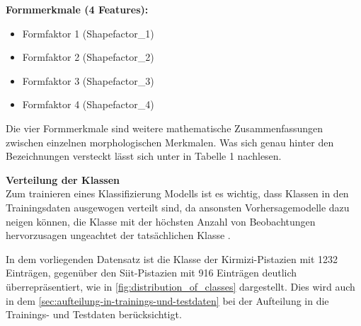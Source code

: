 \textbf{Formmerkmale (4 Features):}
\begin{itemize}[itemsep=0pt, parsep=0pt]
	\item Formfaktor 1 (Shapefactor\_1)
	\item Formfaktor 2 (Shapefactor\_2)
	\item Formfaktor 3 (Shapefactor\_3)
	\item Formfaktor 4 (Shapefactor\_4)
\end{itemize}

Die vier Formmerkmale sind weitere mathematische Zusammenfassungen zwischen einzelnen morphologischen Merkmalen.
Was sich genau hinter den Bezeichnungen versteckt lässt sich unter \parencite[4]{Ozkan.2021} in Tabelle 1 nachlesen.

%
%
%

\textbf{Verteilung der Klassen}\\
Zum trainieren eines Klassifizierung Modells ist es wichtig, dass Klassen in den Trainingsdaten ausgewogen verteilt sind, da ansonsten Vorhersagemodelle dazu neigen können, die Klasse mit der höchsten Anzahl von Beobachtungen hervorzusagen ungeachtet der tatsächlichen Klasse \cite{ZoumanaKeita.2024}.

In dem vorliegenden Datensatz ist die Klasse der Kirmizi-Pistazien mit 1232 Einträgen, gegenüber den Siit-Pistazien mit 916 Einträgen deutlich überrepräsentiert, wie in \autoref{fig:distribution_of_classes} dargestellt.
Dies wird auch in dem \autoref{sec:aufteilung-in-trainings-und-testdaten} bei der Aufteilung in die Trainings- und Testdaten berücksichtigt.

